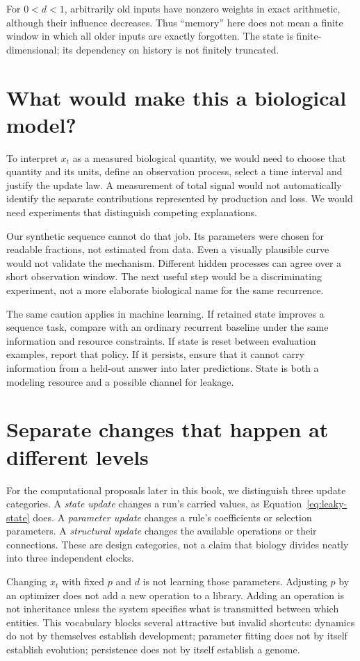 For $0<d<1$, arbitrarily old inputs have nonzero weights in exact arithmetic,
although their influence decreases. Thus ``memory'' here does not mean a
finite window in which all older inputs are exactly forgotten. The state is
finite-dimensional; its dependency on history is not finitely truncated.

\section{What would make this a biological model?}
To interpret $x_t$ as a measured biological quantity, we would need to choose
that quantity and its units, define an observation process, select a time
interval and justify the update law. A measurement of total signal would not
automatically identify the separate contributions represented by production
and loss. We would need experiments that distinguish competing explanations.

Our synthetic sequence cannot do that job. Its parameters were chosen for
readable fractions, not estimated from data. Even a visually plausible curve
would not validate the mechanism. Different hidden processes can agree over
a short observation window. The next useful step would be a discriminating
experiment, not a more elaborate biological name for the same recurrence.

The same caution applies in machine learning. If retained state improves a
sequence task, compare with an ordinary recurrent baseline under the same
information and resource constraints. If state is reset between evaluation
examples, report that policy. If it persists, ensure that it cannot carry
information from a held-out answer into later predictions. State is both a
modeling resource and a possible channel for leakage.

\section{Separate changes that happen at different levels}
For the computational proposals later in this book, we distinguish three
update categories. A \emph{state update} changes a run's carried values, as
Equation~\ref{eq:leaky-state} does. A \emph{parameter update} changes a rule's
coefficients or selection parameters. A \emph{structural update} changes the
available operations or their connections. These are design categories, not
a claim that biology divides neatly into three independent clocks.

Changing $x_t$ with fixed $p$ and $d$ is not learning those parameters. Adjusting
$p$ by an optimizer does not add a new operation to a library. Adding an
operation is not inheritance unless the system specifies what is transmitted
between which entities. This vocabulary blocks several attractive but invalid
shortcuts: dynamics do not by themselves establish development; parameter
fitting does not by itself establish evolution; persistence does not by itself
establish a genome.

